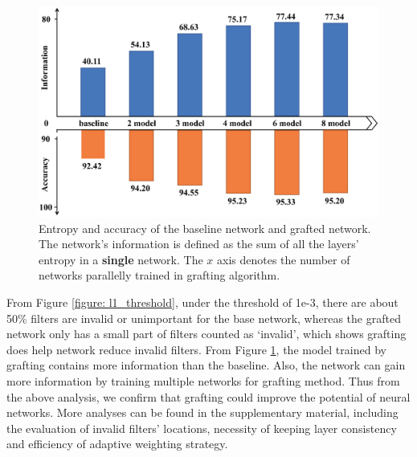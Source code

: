 \documentclass{article}
\begin{document}
\begin{figure}[!h]
	\centering
	\includegraphics[width=15cm,]{fig/entropy_compare.eps}
	\caption{ Entropy and accuracy of the baseline network and grafted network. The network's information is defined as the sum of all the layers' entropy in a \textbf{single} network. The $x$ axis denotes the number of networks parallelly trained in grafting algorithm. }
	\label{figure: entropy_compare}
\end{figure}

From Figure \ref{figure: l1_threshold}, under the threshold of 1e-3, there are about 50\% filters are invalid or unimportant for the base network, whereas the grafted network only has a small part of filters counted as `invalid', which shows grafting does help network reduce invalid filters.
From Figure \ref{figure: entropy_compare}, the model trained by grafting contains more information than the baseline. Also, the network can gain more information by training multiple networks for grafting method.  Thus from the above analysis, we confirm that grafting could improve the potential of neural networks. 
More analyses can be found in the supplementary material, including the evaluation of invalid filters' locations, necessity of keeping layer consistency and efficiency of adaptive weighting strategy.
\end{document}
